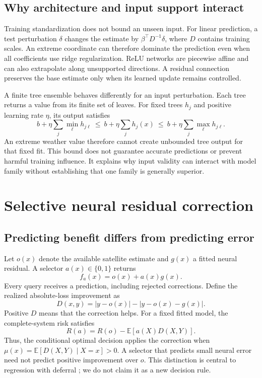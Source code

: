 \documentclass[10pt,letterpaper]{article}
\newcommand{\E}{\mathbb{E}}
\begin{document}
\subsection{Why architecture and input support interact}
Training standardization does not bound an unseen input.
For linear prediction, a test perturbation $\delta$ changes the estimate by $\beta^\top D^{-1}\delta$, where $D$ contains training scales.
An extreme coordinate can therefore dominate the prediction even when all coefficients use ridge regularization.
ReLU networks are piecewise affine and can also extrapolate along unsupported directions.
A residual connection preserves the base estimate only when its learned update remains controlled.

A finite tree ensemble behaves differently for an input perturbation.
Each tree returns a value from its finite set of leaves.
For fixed trees $h_j$ and positive learning rate $\eta$, its output satisfies
\begin{equation}
b+\eta\sum_j\min_\ell h_{j\ell}
\ \leq\ b+\eta\sum_j h_j(x)
\ \leq\ b+\eta\sum_j\max_\ell h_{j\ell}.
\end{equation}
An extreme weather value therefore cannot create unbounded tree output for that fixed fit.
This bound does not guarantee accurate predictions or prevent harmful training influence.
It explains why input validity can interact with model family without establishing that one family is generally superior.

\section{Selective neural residual correction}\label{sec:selective}
\subsection{Predicting benefit differs from predicting error}
Let $o(x)$ denote the available satellite estimate and $g(x)$ a fitted neural residual.
A selector $a(x)\in\{0,1\}$ returns
\begin{equation}
 f_a(x)=o(x)+a(x)g(x).
\end{equation}
Every query receives a prediction, including rejected corrections.
Define the realized absolute-loss improvement as
\begin{equation}\label{eq:gain}
 D(x,y)=|y-o(x)|-|y-o(x)-g(x)|.
\end{equation}
Positive $D$ means that the correction helps.
For a fixed fitted model, the complete-system risk satisfies
\begin{equation}\label{eq:selective-risk}
 R(a)=R(o)-\E[a(X)D(X,Y)].
\end{equation}
Thus, the conditional optimal decision applies the correction when $\mu(x)=\E[D(X,Y)\mid X=x]>0$.
A selector that predicts small neural error need not predict positive improvement over $o$.
This distinction is central to regression with deferral \citep{mao2024}; we do not claim it as a new decision rule.
\end{document}
